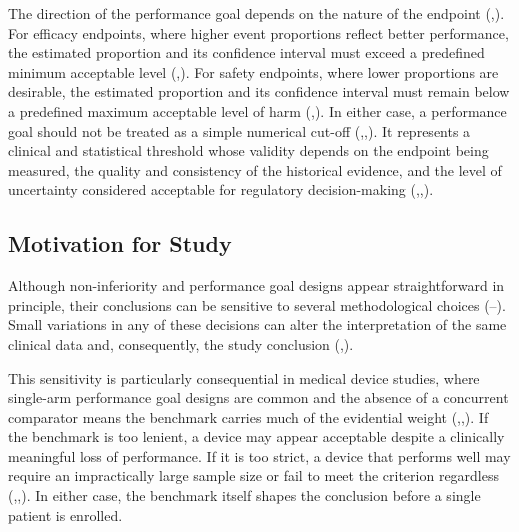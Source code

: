 \documentclass{article}
\begin{document}
The direction of the performance goal depends on the nature of the
endpoint
(,).
For efficacy endpoints, where higher event proportions reflect better
performance, the estimated proportion and its confidence interval must
exceed a predefined minimum acceptable level
(,).
For safety endpoints, where lower proportions are desirable, the
estimated proportion and its confidence interval must remain below a
predefined maximum acceptable level of harm
(,).
In either case, a performance goal should not be treated as a simple
numerical cut-off
(,,).
It represents a clinical and statistical threshold whose validity
depends on the endpoint being measured, the quality and consistency of
the historical evidence, and the level of uncertainty considered
acceptable for regulatory decision-making
(,,).

\subsection{Motivation for Study}\label{motivation-for-study}

Although non-inferiority and performance goal designs appear
straightforward in principle, their conclusions can be sensitive to
several methodological choices
(--).
Small variations in any of these decisions can alter the interpretation
of the same clinical data and, consequently, the study conclusion
(,).

This sensitivity is particularly consequential in medical device
studies, where single-arm performance goal designs are common and the
absence of a concurrent comparator means the benchmark carries much of
the evidential weight
(,,).
If the benchmark is too lenient, a device may appear acceptable despite
a clinically meaningful loss of performance. If it is too strict, a
device that performs well may require an impractically large sample size
or fail to meet the criterion regardless
(,,).
In either case, the benchmark itself shapes the conclusion before a
single patient is enrolled.
\end{document}
